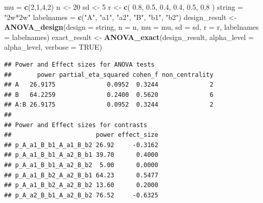 \documentclass[]{book}
\newenvironment{Shaded}{\begin{snugshade}}{\end{snugshade}}
\newcommand{\DataTypeTok}[1]{\textcolor[rgb]{0.13,0.29,0.53}{#1}}
\newcommand{\DecValTok}[1]{\textcolor[rgb]{0.00,0.00,0.81}{#1}}
\newcommand{\FloatTok}[1]{\textcolor[rgb]{0.00,0.00,0.81}{#1}}
\newcommand{\KeywordTok}[1]{\textcolor[rgb]{0.13,0.29,0.53}{\textbf{#1}}}
\newcommand{\NormalTok}[1]{#1}
\newcommand{\OperatorTok}[1]{\textcolor[rgb]{0.81,0.36,0.00}{\textbf{#1}}}
\newcommand{\OtherTok}[1]{\textcolor[rgb]{0.56,0.35,0.01}{#1}}
\newcommand{\StringTok}[1]{\textcolor[rgb]{0.31,0.60,0.02}{#1}}
\begin{document}
\begin{Shaded}
\begin{Highlighting}[]
\NormalTok{mu =}\StringTok{ }\KeywordTok{c}\NormalTok{(}\DecValTok{2}\NormalTok{,}\DecValTok{1}\NormalTok{,}\DecValTok{4}\NormalTok{,}\DecValTok{2}\NormalTok{)}
\NormalTok{n <-}\StringTok{ }\DecValTok{20}
\NormalTok{sd <-}\StringTok{ }\DecValTok{5}
\NormalTok{r <-}\StringTok{ }\KeywordTok{c}\NormalTok{(}
  \FloatTok{0.8}\NormalTok{, }\FloatTok{0.5}\NormalTok{, }\FloatTok{0.4}\NormalTok{,}
  \FloatTok{0.4}\NormalTok{, }\FloatTok{0.5}\NormalTok{,}
  \FloatTok{0.8}
\NormalTok{)}
\NormalTok{string =}\StringTok{ "2w*2w"}
\NormalTok{labelnames =}\StringTok{ }\KeywordTok{c}\NormalTok{(}\StringTok{"A"}\NormalTok{, }\StringTok{"a1"}\NormalTok{, }\StringTok{"a2"}\NormalTok{, }\StringTok{"B"}\NormalTok{, }\StringTok{"b1"}\NormalTok{, }\StringTok{"b2"}\NormalTok{)}
\NormalTok{design_result <-}\StringTok{ }\KeywordTok{ANOVA_design}\NormalTok{(}\DataTypeTok{design =}\NormalTok{ string,}
                              \DataTypeTok{n =}\NormalTok{ n,}
                              \DataTypeTok{mu =}\NormalTok{ mu,}
                              \DataTypeTok{sd =}\NormalTok{ sd,}
                              \DataTypeTok{r =}\NormalTok{ r,}
                              \DataTypeTok{labelnames =}\NormalTok{ labelnames)}
\NormalTok{exact_result <-}\StringTok{ }\KeywordTok{ANOVA_exact}\NormalTok{(design_result,}
                            \DataTypeTok{alpha_level =}\NormalTok{ alpha_level,}
                            \DataTypeTok{verbose =} \OtherTok{TRUE}\NormalTok{)}
\end{Highlighting}
\end{Shaded}

\begin{verbatim}
## Power and Effect sizes for ANOVA tests
##       power partial_eta_squared cohen_f non_centrality
## A   26.9175              0.0952  0.3244              2
## B   64.2259              0.2400  0.5620              6
## A:B 26.9175              0.0952  0.3244              2
## 
## Power and Effect sizes for contrasts
##                       power effect_size
## p_A_a1_B_b1_A_a1_B_b2 26.92     -0.3162
## p_A_a1_B_b1_A_a2_B_b1 39.70      0.4000
## p_A_a1_B_b1_A_a2_B_b2  5.00      0.0000
## p_A_a1_B_b2_A_a2_B_b1 64.23      0.5477
## p_A_a1_B_b2_A_a2_B_b2 13.60      0.2000
## p_A_a2_B_b1_A_a2_B_b2 76.52     -0.6325
\end{verbatim}

\begin{Shaded}
\end{Shaded}
\end{document}
